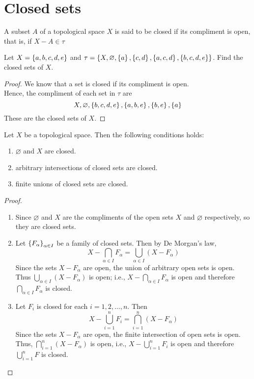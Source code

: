 \documentclass[../main-sheet.tex]{subfiles}
\begin{document}
\section{Closed sets}
\begin{defn}
    A subset  \(A\) of a topological space  \(X\) is said to be closed if its compliment is open, that is, if  \(X-A\in \tau\)
\end{defn}
\begin{ex}
    Let  \(X=\left\{a,b,c,d,e\right\}\) and  \(\tau=\left\{X,\varnothing,\left\{a\right\},\left\{c,d\right\},\left\{a,c,d\right\},\left\{b,c,d,e\right\}\right\}\). Find the closed sets of  \(X\).
\end{ex}
\begin{proof}
    We know that a set is closed if its compliment is open.\\
    Hence, the compliment of each set in  \(\tau\) are
    \[
        X,\varnothing,\left\{b,c,d,e\right\},\left\{a,b,e\right\},\left\{b,e\right\},\left\{a\right\}
    \]
    These are the closed sets of  \(X\).
\end{proof}
\begin{thm}
    Let  \(X\) be a topological space. Then the following conditions holds:
    \begin{enumerate}[label=\alph*)]
        \item  \(\varnothing\) and  \(X\) are closed.
        \item arbitrary intersections of closed sets are closed.
        \item finite unions of closed sets are closed.
    \end{enumerate}
\end{thm}
\begin{proof}
    \hfill
    \begin{enumerate}[label=\alph*)]
        \item Since  \(\varnothing\) and  \(X\) are the compliments of the open sets  \(X\) and  \(\varnothing\) respectively, so they are closed sets.
        \item Let  \(\left\{F_\alpha\right\}_{\alpha\in I}\) be a family of closed sets. Then by De Morgan's law,
        \[
            X-\bigcap_{\alpha\in I}F_\alpha=\bigcup_{\alpha\in I}(X-F_\alpha)
        \]
        Since the sets  \(X-F_\alpha\) are open, the union of arbitrary open sets is open. Thus  \(\bigcup_{\alpha\in I}(X-F_\alpha)\) is open; i.e.,  \(X-\bigcap_{\alpha\in I}F_\alpha\) is open and therefore  \(\bigcap_{\alpha\in I} F_\alpha\) is closed.
        \item Let  \(F_i\) is closed for each  \(i=1,2,\dots,n\). Then
        \[
            X-\bigcup_{i=1}^n F_i=\bigcap_{i=1}^n (X-F_\alpha)
        \]
        Since the sets  \(X-F_\alpha\) are open, the finite intersection of open sets is open. Thus,  \(\bigcap_{i=1}^n (X-F_\alpha)\) is open, i.e.,  \(X-\bigcup_{i=1}^n F_i\) is open and therefore  \(\bigcup_{i=1}^n F\) is closed.
    \end{enumerate}
\end{proof}
\end{document}
